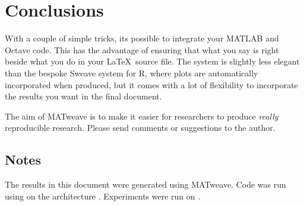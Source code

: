 \documentclass{article}
\begin{document}
\section{Conclusions}

With a couple of simple tricks, its possible to integrate your MATLAB
and Octave code. This has the advantage of ensuring that what you say
is right beside what you do in your \LaTeX\ source file. The system is
slightly less elegant than the bespoke Sweave system for R, where
plots are automatically incorporated when produced, but it comes with
a lot of flexibility to incorporate the results you want in the final
document.

The aim of MATweave is to make it easier for researchers to produce
\emph{really} reproducible research. Please send comments or
suggestions to the author.

\subsection*{Notes}

The results in this document were generated using MATweave. Code was
run using  on the architecture
. Experiments were run on .



\end{document}
